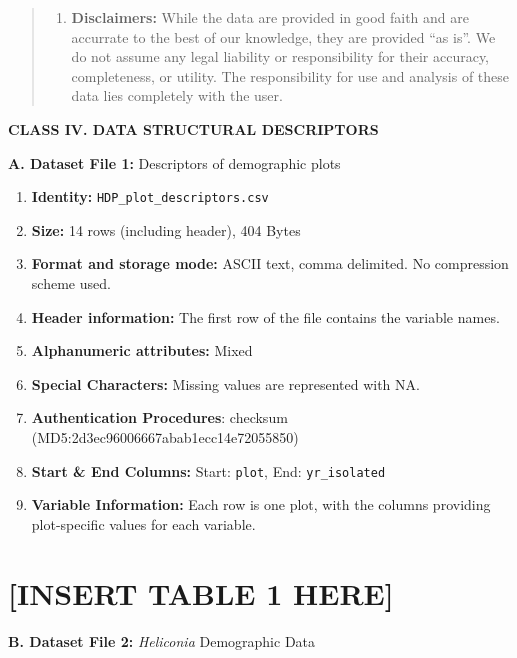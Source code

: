 \documentclass[
  12pt,
  man, donotrepeattitle]{apa6}
\providecommand{\tightlist}{%
  \setlength{\itemsep}{0pt}\setlength{\parskip}{0pt}}
\begin{document}
\begin{quote}
\begin{enumerate}
\def\labelenumi{\alph{enumi}.}
\setcounter{enumi}{3}
\tightlist
\item
  \textbf{Disclaimers:} While the data are provided in good faith and are accurrate to the best of our knowledge, they are provided ``as is''. We do not assume any legal liability or responsibility for their accuracy, completeness, or utility. The responsibility for use and analysis of these data lies completely with the user.
\end{enumerate}
\end{quote}

\noindent  
\textbf{CLASS IV. DATA STRUCTURAL DESCRIPTORS}

\noindent  
\textbf{A. Dataset File 1:} Descriptors of demographic plots

\begin{enumerate}
\def\labelenumi{\arabic{enumi}.}
\item
  \textbf{Identity:} \texttt{HDP\_plot\_descriptors.csv}
\item
  \textbf{Size:} 14 rows (including header), 404 Bytes
\item
  \textbf{Format and storage mode:} ASCII text, comma delimited. No
  compression scheme used.
\item
  \textbf{Header information:} The first row of the file contains the variable names.
\item
  \textbf{Alphanumeric attributes:} Mixed
\item
  \textbf{Special Characters:} Missing values are represented with NA.
\item
  \textbf{Authentication Procedures}: checksum (MD5:2d3ec96006667abab1ecc14e72055850)
\item
  \textbf{Start \& End Columns:} Start: \texttt{plot}, End: \texttt{yr\_isolated}
\item
  \textbf{Variable Information:} Each row is one plot, with the columns providing plot-specific values for each variable.
\end{enumerate}

\hypertarget{insert-table-1-here}{%
\section{{[}INSERT TABLE 1 HERE{]}}\label{insert-table-1-here}}

\noindent 
\textbf{B. Dataset File 2:} \emph{Heliconia} Demographic Data
\end{document}

